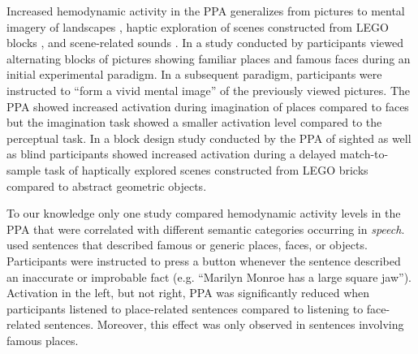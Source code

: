 \documentclass[english,11pt]{article}
\begin{document}
Increased hemodynamic activity in the PPA generalizes from pictures to mental
imagery of landscapes \citep{ocraven2000mental}, haptic exploration of
scenes constructed from LEGO blocks \citep{wolbers2011modality}, and
scene-related sounds \citep{van2017development}.
In a study conducted by \citet{ocraven2000mental} participants viewed
alternating blocks of pictures showing familiar places and famous faces during
an initial experimental paradigm.
In a subsequent paradigm, participants were instructed to ``form a vivid mental
image'' of the previously viewed pictures.
The PPA showed increased activation during imagination of places compared to
faces but the imagination task showed a smaller activation level compared to the
perceptual task.
In a block design study conducted by \citet{wolbers2011modality} the PPA of
sighted as well as blind participants showed increased activation during a
delayed match-to-sample task of haptically explored scenes constructed from LEGO
bricks compared to abstract geometric objects.

To our knowledge only one study \citep{aziz2008modulation} compared hemodynamic
activity levels in the PPA that were correlated with different semantic
categories occurring in \textit{speech}.
\citet{aziz2008modulation} used sentences that described famous or generic
places, faces, or objects.
Participants were instructed to press a button whenever the sentence described
an inaccurate or improbable fact (e.g. ``Marilyn Monroe has a large square
jaw'').
Activation in the left, but not right, PPA was significantly reduced when
participants listened to place-related sentences compared to listening to
face-related sentences. Moreover, this effect was only observed in sentences
involving famous places.
\end{document}
